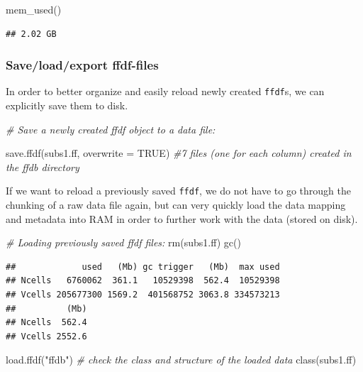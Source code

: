 \documentclass[
  12pt,
]{style/krantz}
\newenvironment{Shaded}{\begin{snugshade}}{\end{snugshade}}
\newcommand{\AttributeTok}[1]{\textcolor[rgb]{0.77,0.63,0.00}{#1}}
\newcommand{\CommentTok}[1]{\textcolor[rgb]{0.56,0.35,0.01}{\textit{#1}}}
\newcommand{\ConstantTok}[1]{\textcolor[rgb]{0.00,0.00,0.00}{#1}}
\newcommand{\FunctionTok}[1]{\textcolor[rgb]{0.00,0.00,0.00}{#1}}
\newcommand{\NormalTok}[1]{#1}
\newcommand{\StringTok}[1]{\textcolor[rgb]{0.31,0.60,0.02}{#1}}
\begin{document}
\begin{Shaded}
\begin{Highlighting}[]
\FunctionTok{mem\_used}\NormalTok{()}
\end{Highlighting}
\end{Shaded}

\begin{verbatim}
## 2.02 GB
\end{verbatim}

\hypertarget{saveloadexport-ffdf-files}{%
\subsubsection{Save/load/export ffdf-files}\label{saveloadexport-ffdf-files}}

In order to better organize and easily reload newly created \texttt{ffdf}s, we can explicitly save them to disk.

\begin{Shaded}
\begin{Highlighting}[]
\CommentTok{\# Save a newly created ffdf object to a data file:}

\FunctionTok{save.ffdf}\NormalTok{(subs1.ff, }\AttributeTok{overwrite =} \ConstantTok{TRUE}\NormalTok{) }\CommentTok{\#7 files (one for each column) created in the ffdb directory}
\end{Highlighting}
\end{Shaded}

If we want to reload a previously saved \texttt{ffdf}, we do not have to go through the chunking of a raw data file again, but can very quickly load the data mapping and metadata into RAM in order to further work with the data (stored on disk).

\begin{Shaded}
\begin{Highlighting}[]
\CommentTok{\# Loading previously saved ffdf files:}
\FunctionTok{rm}\NormalTok{(subs1.ff)}
\FunctionTok{gc}\NormalTok{()}
\end{Highlighting}
\end{Shaded}

\begin{verbatim}
##             used   (Mb) gc trigger   (Mb)  max used
## Ncells   6760062  361.1   10529398  562.4  10529398
## Vcells 205677300 1569.2  401568752 3063.8 334573213
##          (Mb)
## Ncells  562.4
## Vcells 2552.6
\end{verbatim}

\begin{Shaded}
\begin{Highlighting}[]
\FunctionTok{load.ffdf}\NormalTok{(}\StringTok{"ffdb"}\NormalTok{)}
\CommentTok{\# check the class and structure of the loaded data}
\FunctionTok{class}\NormalTok{(subs1.ff) }
\end{Highlighting}
\end{Shaded}
\end{document}
